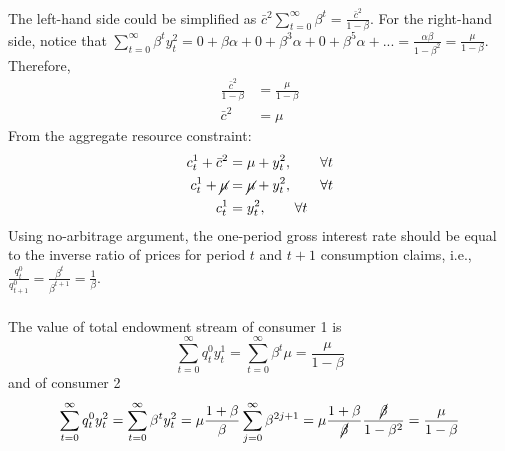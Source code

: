 \documentclass[]{article}
\begin{document}
The left-hand side could be simplified as $\bar{c}^2\sum\limits_{t = 0}^{\infty}\beta^t = \frac{\bar{c}^2}{1 - \beta}$. For the right-hand side, notice that $\sum\limits_{t = 0}^{\infty}\beta^ty_t^2 = 0 + \beta\alpha + 0 + \beta^3\alpha + 0 + \beta^5\alpha + ... = \frac{\alpha\beta}{1 - \beta^2} = \frac{\mu}{1 - \beta}$. Therefore,
\begin{equation}
	\begin{split}
	\frac{\bar{c}^2}{1 - \beta}& = \frac{\mu}{1 - \beta} \\\nonumber
	\bar{c}^2& = \mu
	\end{split}
\end{equation}
From the aggregate resource constraint:
\begin{equation}
	\begin{split}
		c_t^1 + \bar{c}^2& = \mu + y_t^2, \qquad\forall t \\ \nonumber
		c_t^1 + \cancel{\mu}& = \cancel{\mu} + y_t^2, \qquad\forall t  \\
		c_t^1& = y_t^2, \qquad\forall t 
	\end{split}
\end{equation}
Using no-arbitrage argument, the one-period gross interest rate should be equal to the inverse ratio of prices for period $t$ and $t+1$ consumption claims, i.e., $\frac{q_{t}^0}{q_{t+1}^0} = \frac{\beta^{t}}{\beta^{t+1}} = \frac{1}{\beta}$.

\subsubsection{}

The value of total endowment stream of consumer 1 is
\begin{equation}
	\sum\limits_{t = 0}^\infty q_t^0y_t^1 = \sum\limits_{t = 0}^\infty\beta^t\mu = \frac{\mu}{1 - \beta} \nonumber
\end{equation}
and of consumer 2
\begin{equation}
	\sum\limits_{t = 0}^\infty q_t^0y_t^2 = \sum\limits_{t = 0}^\infty\beta^ty_t^2 = \mu\frac{1+\beta}{\beta}\sum\limits_{j = 0}^\infty\beta^{2j + 1} = \mu\frac{1+\beta}{\cancel{\beta}}\frac{\cancel{\beta}}{1 - \beta^2} = \frac{\mu}{1 - \beta} \nonumber
\end{equation}

\subsubsection{}
\end{document}
